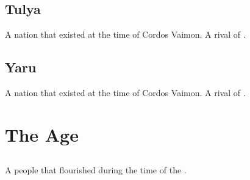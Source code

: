 \section{Tulya}
A \scathaese nation that existed at the time of Cordos Vaimon. 
A rival of \Imrath. 















\section{Yaru}
A \scathaese nation that existed at the time of Cordos Vaimon. 
A rival of \Imrath. 








































\chapter{The \Human Age}
















\section{\Masthenon}
\index{\Masthenon}
A  \scathaese{} people that flourished during the time of the . 


